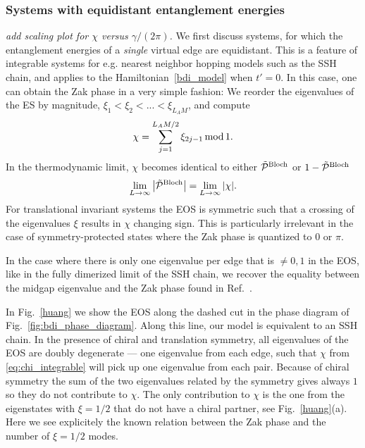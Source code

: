 \documentclass[twocolumn,amsmath,longbibliography,amssymb,superscriptaddress]{revtex4-1}
\newcommand{\mariac}[1]{{\it\color{cyan}#1}}
\begin{document}
\subsubsection{Systems with equidistant entanglement energies}
\mariac{add scaling plot for $\chi$ versus $\gamma/(2\pi)$. }
We first discuss systems, for which the entanglement energies of a \emph{single} virtual edge are equidistant. This is a feature of integrable systems \cite{Peschel1999} for e.g. nearest neighbor hopping models such as the SSH chain, and applies to the Hamiltonian~\eqref{bdi_model} when $t'=0$. 
In this case, one can obtain the Zak phase in a very simple fashion: We reorder the eigenvalues of the ES by magnitude, $\xi_1 < \xi_2 < ...< \xi_{L_AM}$, and compute
\begin{equation}
\chi = \sum_{j=1}^{L_A M/2} \xi_{2j-1} \, {\rm mod} \, 1.
\label{eq:chi_integrable}
\end{equation}
In the thermodynamic limit, $\chi$ becomes identical to either $\tilde{\mathcal{P}}^{\rm Bloch}$ or $1-\tilde{\mathcal{P}}^{\rm Bloch}$
\begin{equation}
\lim_{L \rightarrow \infty} \abs{\tilde{\mathcal{P}}^{\rm Bloch}} = \lim_{L \rightarrow \infty} \abs{\chi}.
\end{equation}
For translational invariant systems the EOS is symmetric such that a crossing of the eigenvalues $\xi$ results in $\chi$ changing sign. This is particularly irrelevant in the case of symmetry-protected states where the Zak phase is quantized to $0$ or $\pi$. 

In the case where there is only one eigenvalue per edge that is $\neq 0,1$ in  the EOS, like in the fully dimerized limit of the SSH chain, we recover the equality between the midgap eigenvalue and the Zak phase found in Ref.~\cite{Ryu2006}. 

In Fig.~\ref{huang} we show  the EOS along the dashed cut in the phase diagram of Fig.~\ref{fig:bdi_phase_diagram}. 
Along this line, our model is equivalent to an SSH chain. 
In the presence of chiral and translation symmetry, all eigenvalues of the EOS are doubly degenerate --- one eigenvalue from each edge, such that $\chi$ from \eqref{eq:chi_integrable} will pick up one eigenvalue from each pair. Because of chiral symmetry the sum of the two eigenvalues related by the symmetry gives always $1$ so they do not contribute to $\chi$. The only contribution to $\chi$ is the one from the eigenstates with $\xi=1/2$ that do not have a chiral partner, see Fig.~\ref{huang}(a). Here we see explicitely the known relation between the Zak phase and the number of $\xi = 1/2$ modes.
\end{document}
